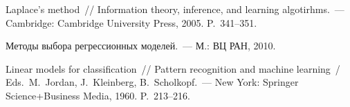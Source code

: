 \begin{multicols}{2}
{{\begin{thebibliography}{99}
 Laplace's method~// Information theory, inference, and learning algotirhms.~--- 
Cambridge: Cambridge University Press, 2005. P.~341--351.


 Методы выбора регрессионных моделей.~--- М.: ВЦ РАН, 2010.


\label{end\stat}

 Linear models for classification~// 
Pattern recognition and machine learning~/ Eds.\ M.~Jordan, J.~Kleinberg, B.~Scholkopf.~--- 
New York: Springer Science\;+\;Business Media, 1960. P.~213--216.
\end{thebibliography}
}
}


\end{multicols}